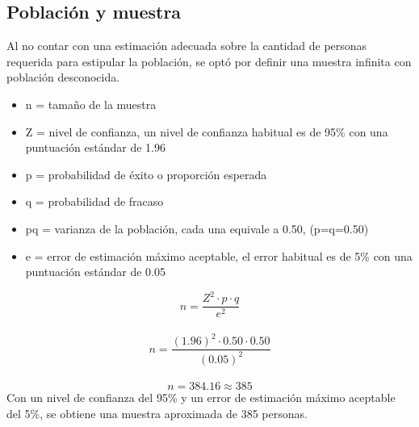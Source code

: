 \subsection{Población y muestra}

Al no contar con una estimación adecuada sobre la cantidad de personas requerida para estipular
la población, se optó por definir una muestra infinita con población desconocida.
\begin{itemize}
    \item n = tamaño de la muestra
    \item Z = nivel de confianza, un nivel de confianza habitual es de 95\% con una puntuación estándar de 1.96
    \item p = probabilidad de éxito o proporción esperada
    \item q = probabilidad de fracaso
    \item pq = varianza de la población, cada una equivale a 0.50, (p=q=0.50)
    \item e = error de estimación máximo aceptable, el error habitual es de 5\% con una puntuación estándar de 0.05
\end{itemize}
\[
    n=\frac{Z^2 \cdot p \cdot q}{e^2}
\]\\
\[
    n=\frac{(1.96)^2 \cdot 0.50 \cdot 0.50}{(0.05)^2}
\]\\
\[
    n=384.16 \approx 385
\]
Con un nivel de confianza del 95\% y un error de estimación máximo aceptable del 5\%, se obtiene una muestra aproximada de 385 personas. \\ \\